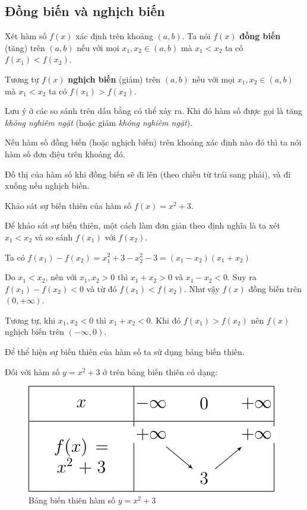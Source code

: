 \subsection*{Đồng biến và nghịch biến}

\begin{definition}
    Xét hàm số $f(x)$ xác định trên khoảng $(a, b)$. Ta nói $f(x)$ \textbf{đồng biến} (tăng) trên $(a, b)$ nếu với mọi $x_1, x_2 \in (a, b)$ mà $x_1 < x_2$ ta có $f(x_1) < f(x_2)$.
\end{definition}

Tương tự $f(x)$ \textbf{nghịch biến} (giảm) trên $(a, b)$ nếu với mọi $x_1, x_2 \in (a, b)$ mà $x_1 < x_2$ ta có $f(x_1) > f(x_2)$.

Lưu ý ở các so sánh trên dấu bằng có thể xảy ra. Khi đó hàm số được gọi là tăng \textit{không nghiêm ngặt} (hoặc giảm \textit{không nghiêm ngặt}).

Nếu hàm số đồng biến (hoặc nghịch biến) trên khoảng xác định nào đó thì ta nói hàm số đơn điệu trên khoảng đó.

Đồ thị của hàm số khi đồng biến sẽ đi lên (theo chiều từ trái sang phải), và đi xuống nếu nghịch biến.

\begin{example}
    Khảo sát sự biến thiên của hàm số $f(x) = x^2 + 3$.

    Để khảo sát sự biến thiên, một cách làm đơn giản theo định nghĩa là ta xét $x_1 < x_2$ và so sánh $f(x_1)$ với $f(x_2)$.

    Ta có $f(x_1) - f(x_2) = x_1^2 + 3 - x_2^2 - 3 = (x_1 - x_2)(x_1 + x_2)$

    Do $x_1 < x_2$, nên với $x_1, x_2 > 0$ thì $x_1 + x_2 > 0$ và $x_1 - x_2 < 0$. Suy ra $f(x_1) - f(x_2) < 0$ và từ đó $f(x_1) < f(x_2)$. Như vậy $f(x)$ đồng biến trên $(0, +\infty)$.

    Tương tự, khi $x_1, x_2 < 0$ thì $x_1 + x_2 < 0$. Khi đó $f(x_1) > f(x_2)$ nên $f(x)$ nghịch biến trên $(-\infty, 0)$.
\end{example}

Để thể hiện sự biến thiên của hàm số ta sử dụng bảng biến thiên.

Đối với hàm số $y = x^2 + 3$ ở trên bảng biến thiên có dạng:

\begin{figure}[bh]
    \centering
    \includegraphics[page=1]{figures/table_of_variation.pdf}
    \caption{Bảng biến thiên hàm số $y=x^2 + 3$}
\end{figure}

